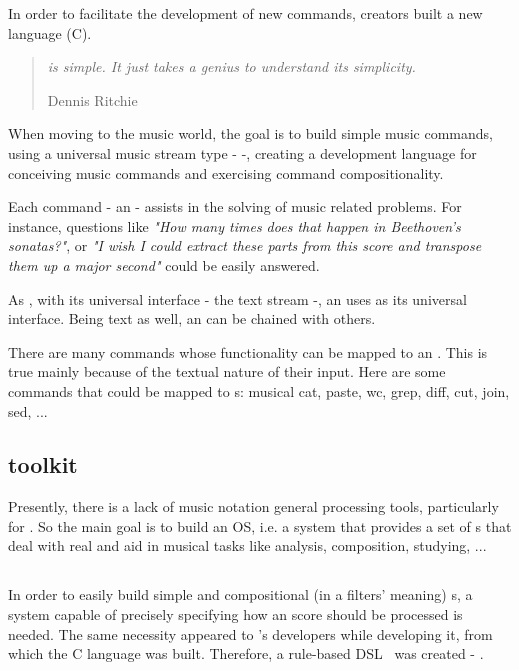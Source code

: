 In order to facilitate the development of new \unix{} commands, \unix{} creators built a new
language (C).

\begin{quotation}
  \small\textit{\unix{} is simple. It just takes a genius to understand its simplicity.}
  \begin{flushright}
    Dennis Ritchie
  \end{flushright}
\end{quotation}

When moving to the music world, the goal is to build simple music commands, using a universal music
stream type - \abc{} -, creating a development language for conceiving music commands and exercising
command compositionality.

Each command - an \abcpt{} - assists in the solving of music related problems. For instance,
questions like \textit{"How many times does that happen in Beethoven's sonatas?"}, or \textit{"I
wish I could extract these parts from this score and transpose them up a major second"} could be
easily answered.

As \unix{}, with its universal interface - the text stream -, an \abcpt{} uses \abc{} as its
universal interface. Being text as well, an \abcpt{} can be chained with others.

There are many \unix{} commands whose functionality can be mapped to an \abcpt{}. This is true mainly
because of the textual nature of their input. Here are some \unix{} commands that could be mapped to
\abcpt{}s: musical cat, paste, wc, grep, diff, cut, join, sed, ...

\subsection*{\abc{} toolkit}

Presently, there is a lack of music notation general processing tools, particularly for \abc{}. So
the main goal is to build an \abc{} \ac{OS}, i.e. a system that provides a set of \abcpt{}s that
deal with real \abc{} and aid in musical tasks like analysis, composition, studying, ...

\subsection*{\abcdt{}}

In order to easily build simple and compositional (in a \unix{} filters' meaning) \abcpt{}s, a
system capable of precisely specifying how an \abc{} score should be processed is needed. The same
necessity appeared to \unix{}'s developers while developing it, from which the C language was built.
Therefore, a rule-based \ac{DSL}~\cite{kosar2010comparing,kosar2008preliminary} was created - \abcdt{}.

